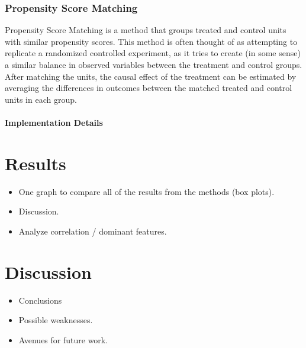 \documentclass[11pt]{article}
\newcommand{\todo}[1]{{\color{orange}{TODO: #1}}}
\begin{document}
\subsubsection{Propensity Score Matching}

Propensity Score Matching is a method that groups treated and control units with similar propensity scores. This method is often thought of as attempting to replicate a randomized controlled experiment, as it tries to create (in some sense) a similar balance in observed variables between the treatment and control groups. After matching the units, the causal effect of the treatment can be estimated by averaging the differences in outcomes between the matched treated and control units in each group.

\paragraph{Implementation Details} \todo{Details about the implementation of Propensity Score Matching.}







\section{Results}

\begin{itemize}
    \item One graph to compare all of the results from the methods (box plots).
    \item Discussion.
    \item Analyze correlation / dominant features.
\end{itemize}

\section{Discussion}

\begin{itemize}
    \item Conclusions
    \item Possible weaknesses.
    \item Avenues for future work.
\end{itemize}



\appendix
\end{document}
